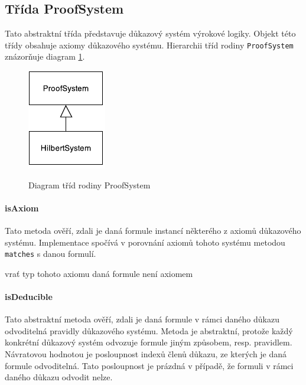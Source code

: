 \documentclass[thesis=B,czech,hidelinks]{thesis}[2012/06/26]
\begin{document}
\subsection{Třída ProofSystem}

Tato abstraktní třída představuje důkazový systém výrokové logiky. Objekt této třídy obsahuje axiomy důkazového systému. Hierarchii tříd rodiny \texttt{ProofSystem} znázorňuje diagram \ref{fig:proof_system}.

\begin{figure}
\centering
\caption{Diagram tříd rodiny ProofSystem}
\includegraphics{diagrams/proof_system}
\label{fig:proof_system}
\end{figure}

\paragraph{isAxiom}

Tato metoda ověří, zdali je daná formule instancí některého z axiomů důkazového systému. Implementace spočívá v porovnání axiomů tohoto systému metodou \texttt{matches} s danou formulí.

\begin{algorithm}
{
	{
		vrať typ tohoto axiomu\;
	}
}
daná formule není axiomem\;
\end{algorithm}

\paragraph{isDeducible}

Tato abstraktní metoda ověří, zdali je daná formule v rámci daného důkazu odvoditelná pravidly důkazového systému. Metoda je abstraktní, protože každý konkrétní důkazový systém odvozuje formule jiným způsobem, resp. pravidlem. Návratovou hodnotou je posloupnost indexů členů důkazu, ze kterých je daná formule odvoditelná. Tato posloupnost je prázdná v případě, že formuli v rámci daného důkazu odvodit nelze.
\end{document}
